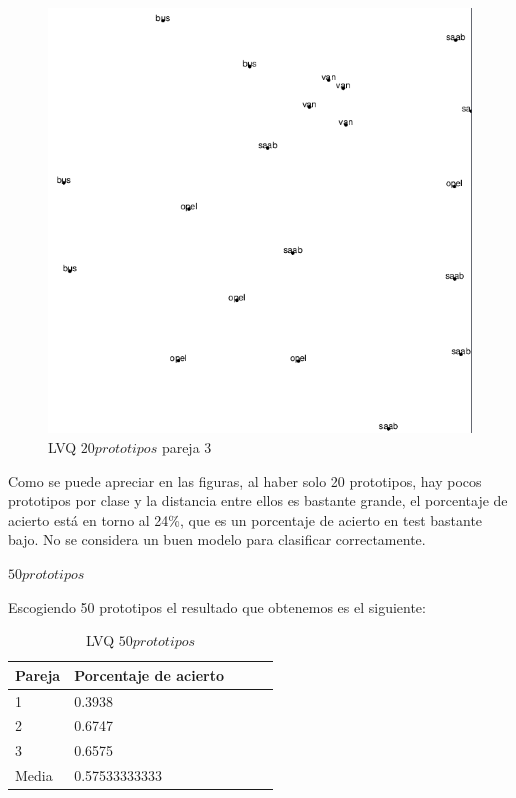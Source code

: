 \documentclass[11pt,spanish,listoffigures,listoftables]{workluis}
\begin{document}
\begin{figure}[H]
\centering
\includegraphics[scale=0.5]{lvq20p3}
\caption{LVQ $20 prototipos$ pareja 3}
\end{figure} 

\par Como se puede apreciar en las figuras, al haber solo 20 prototipos, hay pocos prototipos por clase y la distancia entre ellos es bastante grande, el porcentaje de acierto está en torno al 24\%, que es un porcentaje de acierto en test bastante bajo. No se considera un buen modelo para clasificar correctamente.


\par \textbf{$50 prototipos$}

\par Escogiendo 50 prototipos el resultado que obtenemos es el siguiente:

\begin{table}[H]
\centering
\caption{LVQ $50 prototipos$}
\label{tb:tb22}
\begin{tabular}{lllll}
\hline
\multicolumn{1}{|l|}{Pareja} & Porcentaje de acierto \\ \hline \hline
1                            & 0.3938			     \\
2                            & 0.6747			     \\
3                            & 0.6575			     \\
Media                        & 0.57533333333         \\ \hline
\end{tabular}
\end{table}
\end{document}
